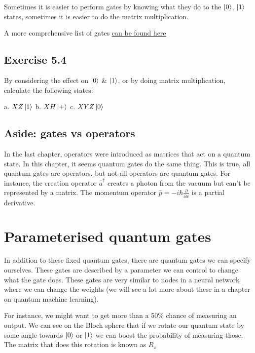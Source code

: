 \documentclass{book}
\begin{document}
Sometimes it is easier to perform gates by knowing what they do to the $\ket{0}$, $\ket{1}$ states, sometimes it is easier to do the matrix multiplication. 

A more comprehensive list of gates \href{https://raw.githubusercontent.com/qiskit-community/qiskit-textbook/main/content/ch-states/supplements/single-gates-cheatsheet.pdf}{can be found here}



\subsection{Exercise 5.4}

By considering the effect on $\ket{0}$ \& $ \ket{1}$, or by doing matrix multiplication, calculate the following states:

a. $ XZ\ket{1}$  
b. $ XH\ket{+} $  
c. $ XYZ\ket{0} $


\subsection{Aside: gates vs operators}

In the last chapter, operators were introduced as matrices that act on a quantum state. In this chapter, it seems quantum gates do the same thing. This is true, all quantum gates are operators, but not all operators are quantum gates. 
For instance, the creation operator $\hat{a}^\dagger$ creates a photon from the vacuum but can't be represented by a matrix. The momentum operator $\hat{p} = -i\hbar\frac{\partial}{\partial x}$ is a partial derivative. 


\section{Parameterised quantum gates }

In addition to these fixed quantum gates, there are quantum gates we can specify ourselves. These gates are described by a parameter we can control to change what the gate does. These gates are very similar to nodes in a neural network where we can change the weights (we will see a lot more about these in a chapter on quantum machine learning).

For instance, we might want to get more than a 50\% chance of measuring an output. We can see on the Bloch sphere that if we rotate our quantum state by some angle towards $\ket{0}$ or $\ket{1}$ we can boost the probability of measuring those. The matrix that does this rotation is known as $R_x$
\end{document}
